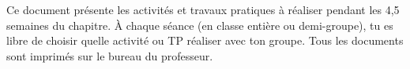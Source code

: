 \teteTermStssBiom
\reinitialiseActiviteTP
\vspace*{-40pt}
\vspace*{-8pt}

  Ce document présente les activités et travaux pratiques à réaliser pendant les 4,5 semaines du chapitre.
  À chaque séance (en classe entière ou demi-groupe), tu es libre de choisir quelle activité ou TP réaliser avec ton groupe.
  Tous les documents sont imprimés sur le bureau du professeur.


\vspace*{-8pt}
\vspace*{-20pt}

